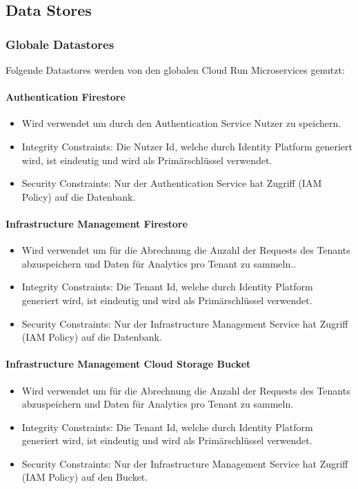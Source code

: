 \subsection{Data Stores}

\subsubsection{Globale Datastores}
Folgende Datastores werden von den globalen Cloud Run Microservices genutzt:

\paragraph{Authentication Firestore}
\begin{itemize}
	\item Wird verwendet um durch den Authentication Service Nutzer zu speichern.
	\item Integrity Constraints: Die Nutzer Id, welche durch Identity Platform generiert wird, ist eindeutig und wird als Primärschlüssel verwendet.
	\item Security Constraints: Nur der Authentication Service hat Zugriff (IAM Policy) auf die Datenbank.
\end{itemize}

\paragraph{Infrastructure Management Firestore}
\begin{itemize}
	\item Wird verwendet um für die Abrechnung die Anzahl der Requests des Tenants abzuspeichern und Daten für Analytics pro Tenant zu sammeln..
	\item Integrity Constraints: Die Tenant Id, welche durch Identity Platform generiert wird, ist eindeutig und wird als Primärschlüssel verwendet.
	\item Security Constraints: Nur der Infrastructure Management Service hat Zugriff (IAM Policy) auf die Datenbank.
\end{itemize}

\paragraph{Infrastructure Management Cloud Storage Bucket}
\begin{itemize}
	\item Wird verwendet um für die Abrechnung die Anzahl der Requests des Tenants abzuspeichern und Daten für Analytics pro Tenant zu sammeln.
	\item Integrity Constraints: Die Tenant Id, welche durch Identity Platform generiert wird, ist eindeutig und wird als Primärschlüssel verwendet.
	\item Security Constraints: Nur der Infrastructure Management Service hat Zugriff (IAM Policy) auf den Bucket.
\end{itemize}

